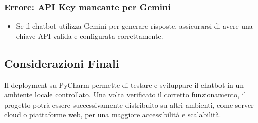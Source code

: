 \documentclass[12pt, letterpaper]{article}
\begin{document}
\subsubsection{Errore: API Key mancante per Gemini}
\begin{itemize}
	\item Se il chatbot utilizza Gemini per generare risposte, assicurarsi di avere una chiave API valida e configurata correttamente.
\end{itemize}

\subsection{Considerazioni Finali}

Il deployment su PyCharm permette di testare e sviluppare il chatbot in un ambiente locale controllato. Una volta verificato il corretto funzionamento, il progetto potrà essere successivamente distribuito su altri ambienti, come server cloud o piattaforme web, per una maggiore accessibilità e scalabilità.

\newpage
\end{document}
